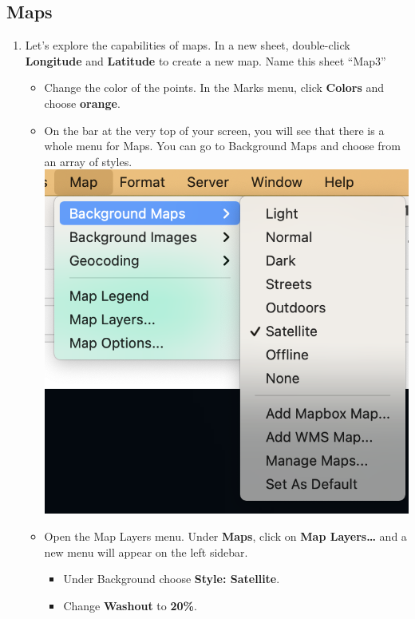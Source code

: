 \documentclass[
]{book}
\providecommand{\tightlist}{%
  \setlength{\itemsep}{0pt}\setlength{\parskip}{0pt}}
\begin{document}
\hypertarget{maps}{%
\subsection{Maps}\label{maps}}

\begin{enumerate}
\def\labelenumi{\arabic{enumi}.}
\tightlist
\item
  Let's explore the capabilities of maps. In a new sheet, double-click \textbf{Longitude} and \textbf{Latitude} to create a new map. Name this sheet ``Map3''

  \begin{itemize}
  \tightlist
  \item
    Change the color of the points. In the Marks menu, click \textbf{Colors} and choose \textbf{orange}.
  \item
    On the bar at the very top of your screen, you will see that there is a whole menu for Maps. You can go to Background Maps and choose from an array of styles.
    \includegraphics{images/M3S3-map3-menu.png}
  \item
    Open the Map Layers menu. Under \textbf{Maps}, click on \textbf{Map Layers\ldots{}} and a new menu will appear on the left sidebar.

    \begin{itemize}
    \tightlist
    \item
      Under Background choose \textbf{Style: Satellite}.
    \item
      Change \textbf{Washout} to \textbf{20\%}.


\end{itemize}
\end{itemize}
\end{enumerate}
\end{document}
